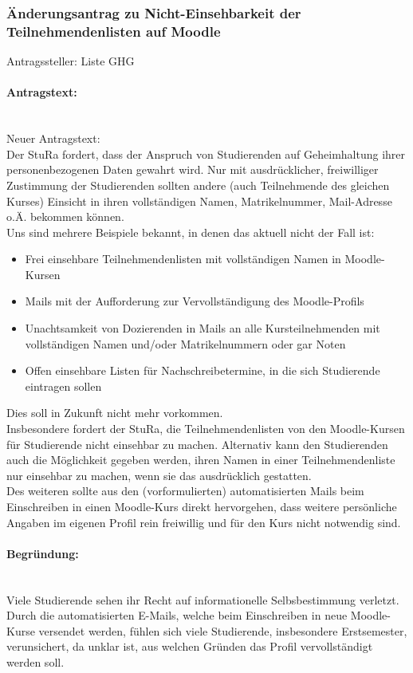 \subsubsection{Änderungsantrag zu Nicht-Einsehbarkeit der Teilnehmendenlisten auf Moodle}
Antragssteller: Liste GHG
\paragraph{Antragstext:}\phantom{spacer}\\
Neuer Antragstext:\\
 Der StuRa fordert, dass der Anspruch von Studierenden auf Geheimhaltung ihrer
 personenbezogenen Daten gewahrt wird. Nur mit ausdrücklicher, freiwilliger Zustimmung
 der Studierenden sollten andere (auch Teilnehmende des gleichen Kurses) Einsicht in
 ihren vollständigen Namen, Matrikelnummer, Mail-Adresse o.Ä. bekommen können.\\
 Uns sind mehrere Beispiele bekannt, in denen das aktuell nicht der Fall ist:
    \begin{itemize}
        \item Frei einsehbare Teilnehmendenlisten mit vollständigen Namen in Moodle-Kursen
        \item Mails mit der Aufforderung zur Vervollständigung des Moodle-Profils
        \item Unachtsamkeit von Dozierenden in Mails an alle Kursteilnehmenden mit vollständigen Namen und/oder Matrikelnummern oder gar Noten
        \item Offen einsehbare Listen für Nachschreibetermine, in die sich Studierende eintragen sollen
    \end{itemize}
 Dies soll in Zukunft nicht mehr vorkommen.\\
 Insbesondere fordert der StuRa, die Teilnehmendenlisten von den Moodle-Kursen für
 Studierende nicht einsehbar zu machen. Alternativ kann den Studierenden auch die
 Möglichkeit gegeben werden, ihren Namen in einer Teilnehmendenliste nur einsehbar zu
 machen, wenn sie das ausdrücklich gestatten.\\
 Des weiteren sollte aus den (vorformulierten) automatisierten Mails beim Einschreiben
 in einen Moodle-Kurs direkt hervorgehen, dass weitere persönliche Angaben im eigenen
 Profil rein freiwillig und für den Kurs nicht notwendig sind.
\paragraph{Begründung:}\phantom{spacer}\\
Viele Studierende sehen ihr Recht auf informationelle Selbsbestimmung verletzt.\\
Durch die automatisierten E-Mails, welche beim Einschreiben in neue Moodle-Kurse versendet werden, fühlen sich viele Studierende, insbesondere Erstsemester, verunsichert, da unklar ist, aus welchen Gründen das Profil vervollständigt werden soll.

